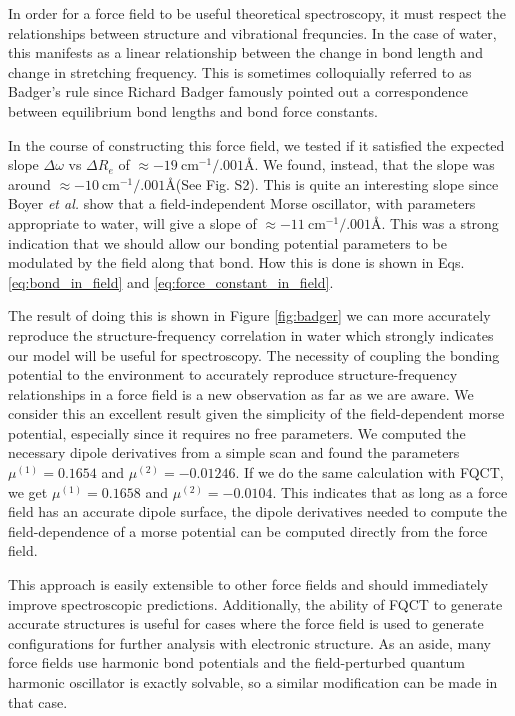 \documentclass[journal=jctcce,manuscript=article]{achemso}
\begin{document}
In order for a force field to be useful theoretical spectroscopy, it must respect the relationships between structure and vibrational frequncies. In the case of water, this manifests as a linear relationship between the change in bond length and change in  stretching frequency.\cite{boyer2019beyond} This is sometimes colloquially referred to as Badger's rule since Richard Badger famously pointed out a correspondence between equilibrium bond lengths and bond force constants.\cite{badger1934relation}

In the course of constructing this force field, we tested if it satisfied the expected slope $\Delta\omega$ vs $\Delta R_e$ of $\approx -19\ \mathrm{cm^{-1}/.001}$\AA\cite{boyer2019beyond}. We found, instead, that the slope was around $\approx -10\ \mathrm{cm^{-1}/.001}$\AA (See Fig. S2). This is quite an interesting slope since Boyer \textit{et al.} show that a field-independent Morse oscillator, with parameters appropriate to water, will give a slope of $\approx -11\ \mathrm{cm^{-1}/.001}$\AA. This was a strong indication that we should allow our bonding potential parameters to be modulated by the field along that bond. How this is done is shown in Eqs. \ref{eq:bond_in_field} and \ref{eq:force_constant_in_field}.

The result of doing this is shown in Figure \ref{fig:badger} we can more accurately reproduce the structure-frequency correlation in water which strongly indicates our model will be useful for spectroscopy. The necessity of coupling the bonding potential to the environment to accurately reproduce structure-frequency relationships in a force field is a new observation as far as we are aware. We consider this an excellent result given the simplicity of the field-dependent morse potential, especially since it requires no free parameters. We computed the necessary dipole derivatives from a simple  scan and found the parameters $\mu^{(1)}=0.1654$ and $\mu^{(2)}=-0.01246$. If we do the same calculation with FQCT, we get $\mu^{(1)}=0.1658$ and $\mu^{(2)}=-0.0104$. This indicates that as long as a force field has an accurate dipole surface, the dipole derivatives needed to compute the field-dependence of a morse potential can be computed directly from the force field.

This approach is easily extensible to other force fields and should immediately improve spectroscopic predictions. Additionally, the ability of FQCT to generate accurate structures is useful for cases where the force field is used to generate configurations for further analysis with electronic structure. As an aside, many force fields use harmonic bond potentials and the field-perturbed quantum harmonic oscillator is exactly solvable, so a similar modification can be made in that case.
\end{document}
